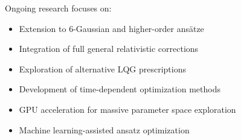 \documentclass[12pt]{article}
\begin{document}
Ongoing research focuses on:
\begin{itemize}
\item Extension to 6-Gaussian and higher-order ansätze
\item Integration of full general relativistic corrections
\item Exploration of alternative LQG prescriptions
\item Development of time-dependent optimization methods
\item GPU acceleration for massive parameter space exploration
\item Machine learning-assisted ansatz optimization
\end{itemize}
\end{document}
